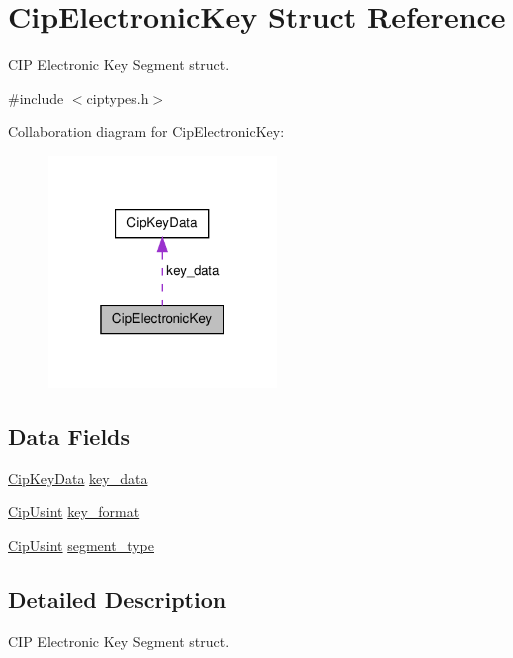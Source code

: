 \hypertarget{structCipElectronicKey}{\section{\-Cip\-Electronic\-Key \-Struct \-Reference}
\label{d9/da7/structCipElectronicKey}
}


\-C\-I\-P \-Electronic \-Key \-Segment struct.  




{\ttfamily \#include $<$ciptypes.\-h$>$}



\-Collaboration diagram for \-Cip\-Electronic\-Key\-:
\nopagebreak
\begin{figure}[H]
\begin{center}
\leavevmode
\includegraphics[width=172pt]{d2/db4/structCipElectronicKey__coll__graph}
\end{center}
\end{figure}
\subsection*{\-Data \-Fields}
\begin{DoxyCompactItemize}
\item 
\hyperlink{structCipKeyData}{\-Cip\-Key\-Data} \hyperlink{structCipElectronicKey_a8ff4fd3c53360adf303a1a798c4c4f3f}{key\-\_\-data}
\item 
\hyperlink{typedefs_8h_a378b726bef4c65cb2ec1c1cdf1205f52}{\-Cip\-Usint} \hyperlink{structCipElectronicKey_ad82a56c49cc3fe01d397a247fedc5e8e}{key\-\_\-format}
\item 
\hyperlink{typedefs_8h_a378b726bef4c65cb2ec1c1cdf1205f52}{\-Cip\-Usint} \hyperlink{structCipElectronicKey_ab97c41c46f877d65e5e2b2aa2428b5c5}{segment\-\_\-type}
\end{DoxyCompactItemize}


\subsection{\-Detailed \-Description}
\-C\-I\-P \-Electronic \-Key \-Segment struct. 



